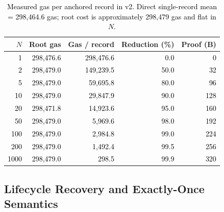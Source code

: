 \documentclass[final,5p,times,twocolumn]{elsarticle}
\begin{document}
\begin{table}[htbp]\centering
\caption{\textcolor{black}{Measured gas per anchored record in v2. Direct single-record mean = 298{,}464.6 gas; root cost is approximately 298{,}479 gas and flat in $N$.}}
\label{tab:gas}
\scriptsize
\setlength{\tabcolsep}{2.4pt}
\begin{tabular}{rrrrr}\toprule
$N$ & Root gas & Gas / record & Reduction (\%) & Proof (B) \\\midrule
\textcolor{black}{1}   & \textcolor{black}{298{,}476.6} & \textcolor{black}{298{,}476.6} & \textcolor{black}{0.0} & \textcolor{black}{0} \\
\textcolor{black}{2}   & \textcolor{black}{298{,}479.0} & \textcolor{black}{149{,}239.5} & \textcolor{black}{50.0} & \textcolor{black}{32} \\
\textcolor{black}{5}   & \textcolor{black}{298{,}479.0} & \textcolor{black}{59{,}695.8} & \textcolor{black}{80.0} & \textcolor{black}{96} \\
\textcolor{black}{10}  & \textcolor{black}{298{,}479.0} & \textcolor{black}{29{,}847.9} & \textcolor{black}{90.0} & \textcolor{black}{128} \\
\textcolor{black}{20}  & \textcolor{black}{298{,}471.8} & \textcolor{black}{14{,}923.6} & \textcolor{black}{95.0} & \textcolor{black}{160} \\
\textcolor{black}{50}  & \textcolor{black}{298{,}479.0} & \textcolor{black}{5{,}969.6} & \textcolor{black}{98.0} & \textcolor{black}{192} \\
\textcolor{black}{100} & \textcolor{black}{298{,}479.0} & \textcolor{black}{2{,}984.8} & \textcolor{black}{99.0} & \textcolor{black}{224} \\
\textcolor{black}{200} & \textcolor{black}{298{,}479.0} & \textcolor{black}{1{,}492.4} & \textcolor{black}{99.5} & \textcolor{black}{256} \\
\textcolor{black}{1000} & \textcolor{black}{298{,}479.0} & \textcolor{black}{298.5} & \textcolor{black}{99.9} & \textcolor{black}{320} \\
\bottomrule\end{tabular}
\end{table}



\subsection{\textbf{Lifecycle Recovery and Exactly-Once Semantics}}
\label{sec:res_lifecycle}
\end{document}
